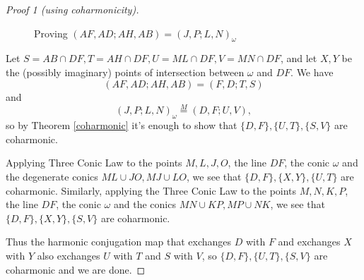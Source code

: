 \begin{proof}[Proof 1 (using coharmonicity)]
\begin{figure}[!htb]
\caption{Proving $(AF,AD;AH,AB) = (J,P;L,N)_\omega$}\label{octa1}
\end{figure}
Let $S = AB \cap DF, T = AH \cap DF, U = ML \cap DF, V = MN \cap DF$, and let $X,Y$ be the (possibly imaginary) points of intersection between $\omega$ and $DF$. We have
\[
(AF,AD;AH,AB) = (F,D;T,S)
\]
and
\[
(J,P;L,N)_\omega \stackrel{M}{=} (D,F;U,V),
\]
so by Theorem \ref{coharmonic} it's enough to show that $\{D,F\},\{U,T\},\{S,V\}$ are coharmonic.

Applying Three Conic Law to the points $M,L,J,O$, the line $DF$, the conic $\omega$ and the degenerate conics $ML\cup JO, MJ\cup LO$, we see that $\{D,F\}, \{X,Y\}, \{U,T\}$ are coharmonic. Similarly, applying the Three Conic Law to the points $M,N,K,P$, the line $DF$, the conic $\omega$ and the conics $MN\cup KP, MP\cup NK$, we see that $\{D,F\}, \{X,Y\}, \{S,V\}$ are coharmonic.

Thus the harmonic conjugation map that exchanges $D$ with $F$ and exchanges $X$ with $Y$ also exchanges $U$ with $T$ and $S$ with $V$, so $\{D,F\},\{U,T\},\{S,V\}$ are coharmonic and we are done.
\end{proof}
